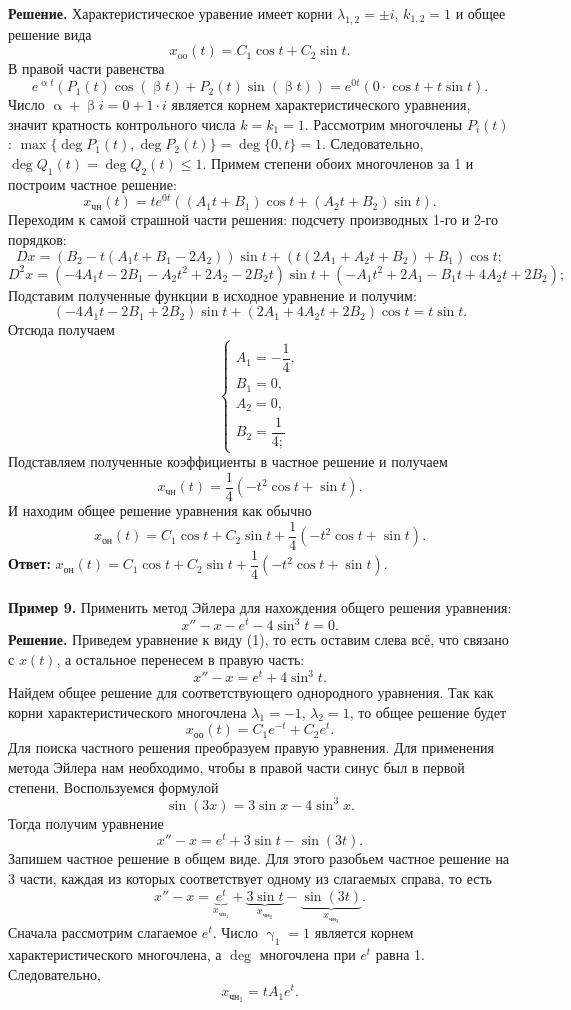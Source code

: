 \documentclass[a4paper, 12pt]{article}
\renewcommand{\alpha}{\upalpha}
\renewcommand{\beta}{\upbeta}
\begin{document}
\textbf{Решение.} Характеристическое уравение имеет корни $\lambda_{1,2} = \pm i$, $k_{1,2} = 1$ и общее решение вида $$x_\text{oo}(t)= C_1\cos t + C_2\sin t.$$ В правой части равенства $$e^{\alpha t}(P_1(t)\cos(\beta t) + P_2(t)\sin (\beta t)) = e^{0t}(0\cdot \cos t + t\sin t).$$ Число $\alpha + \beta i = 0 + 1\cdot i$ является корнем характеристического уравнения, значит кратность контрольного числа $k = k_1 = 1$. Рассмотрим многочлены $P_i(t)$: $\max\{\deg P_1(t), \deg P_2(t)\} = \deg\{0, t\} = 1$. Следовательно, $\deg Q_1(t) = \deg Q_2(t) \leqslant 1$. Примем степени обоих многочленов за 1 и построим частное решение:
$$x_\text{чн}(t) =te^{0 t}((A_1t+B_1)\cos t + (A_2t + B_2)\sin t).$$ Переходим к самой страшной части решения: подсчету производных 1-го и 2-го порядков:
$$Dx = (B_2 - t(A_1t + B_1 - 2A_2))\sin t + (t(2A_1 + A_2t + B_2)+B_1)\cos t;$$
$$D^2x = (-4A_1t - 2B_1 - A_2t^2 + 2A_2-2B_2t)\sin t + (-A_1t^2 + 2A_1-B_1t+4A_2t+2B_2);$$
Подставим полученные функции в исходное уравнение и получим:
$$(-4A_1t - 2B_1 + 2B_2)\sin t + (2A_1 + 4A_2t + 2B_2)\cos t = t\sin t.$$
Отсюда получаем $$\begin{cases}
	A_1 = -\dfrac{1}{4},\\
	B_1 = 0,\\
	A_2 = 0,\\
	B_2 = \dfrac{1}{4;}
\end{cases}$$
Подставляем полученные коэффициенты в частное решение и получаем $$x_\text{чн}(t) = \dfrac{1}{4}(-t^2\cos t + \sin t).$$
И находим общее решение уравнения как обычно
$$x_\text{он}(t) =C_1\cos t + C_2\sin t +\dfrac{1}{4}(-t^2\cos t + \sin t).$$
\textbf{Ответ:} $x_\text{он}(t) =C_1\cos t + C_2\sin t +\dfrac{1}{4}(-t^2\cos t + \sin t).$\\\\
\textbf{Пример 9.} Применить метод Эйлера для нахождения общего решения уравнения: $$x'' - x - e^t - 4\sin^3t = 0.$$
\textbf{Решение.} Приведем уравнение к виду (1), то есть оставим слева всё, что связано с $x(t)$, а остальное перенесем в правую часть:
$$x'' - x = e^t + 4\sin^3t.$$
Найдем общее решение для соответствующего однородного уравнения. Так как корни характеристического многочлена $\lambda_1 = -1$, $\lambda_2 = 1$, то общее решение будет $$x_{\text{оо}}(t) = C_1e^{-t} + C_2 e^t.$$
Для поиска частного решения преобразуем правую уравнения. Для применения метода Эйлера нам необходимо, чтобы в правой части синус был в первой степени. Воспользуемся формулой $$\sin(3x) = 3\sin x - 4\sin^3x.$$
Тогда получим уравнение $$x'' - x = e^t + 3\sin t - \sin(3t).$$
Запишем частное решение в общем виде. Для этого разобьем частное решение на 3 части, каждая из которых соответствует одному из слагаемых справа, то есть $$x'' - x = \underbrace{e^t}_{x_{\text{чн}_1}} + \underbrace{3\sin t}_{x_{\text{чн}_2}} - \underbrace{\sin(3t)}_{x_{\text{чн}_3}}.$$ Сначала рассмотрим слагаемое $e^t$. Число $\upgamma_1 = 1$ является корнем характеристического многочлена, а $\deg$ многочлена при $e^t$ равна 1. Следовательно, $$x_{\text{чн}_1} = tA_1e^t.$$
\end{document}
